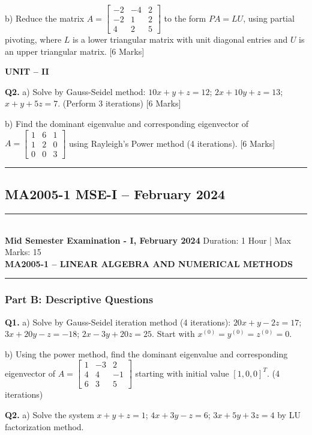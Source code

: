\documentclass[11pt,a4paper]{article}
\newcommand{\examheader}[4]{
\noindent\rule{\textwidth}{0.5pt}\\
\textbf{#1} \hfill Duration: #3 | Max Marks: #4\\
\textbf{#2}\\
\rule{\textwidth}{0.5pt}
\vspace{0.2cm}
}
\begin{document}
b) Reduce the matrix $A = \begin{bmatrix} -2 & -4 & 2 \\ -2 & 1 & 2 \\ 4 & 2 & 5 \end{bmatrix}$ to the form $PA = LU$, using partial pivoting, where $L$ is a lower triangular matrix with unit diagonal entries and $U$ is an upper triangular matrix. \hfill [6 Marks]

\textbf{UNIT -- II}

\textbf{Q2.} a) Solve by Gauss-Seidel method: $10x + y + z = 12$; $2x + 10y + z = 13$; $x + y + 5z = 7$. (Perform 3 iterations) \hfill [6 Marks]

b) Find the dominant eigenvalue and corresponding eigenvector of $A = \begin{bmatrix} 1 & 6 & 1 \\ 1 & 2 & 0 \\ 0 & 0 & 3 \end{bmatrix}$ using Rayleigh's Power method (4 iterations). \hfill [6 Marks]

\vspace{0.5cm}
\hrule
\vspace{0.5cm}

\subsection{MA2005-1 MSE-I -- February 2024}
\examheader{Mid Semester Examination - I, February 2024}{MA2005-1 -- LINEAR ALGEBRA AND NUMERICAL METHODS}{1 Hour}{15}

\subsubsection*{Part B: Descriptive Questions}

\textbf{Q1.} a) Solve by Gauss-Seidel iteration method (4 iterations): $20x + y - 2z = 17$; $3x + 20y - z = -18$; $2x - 3y + 20z = 25$. Start with $x^{(0)} = y^{(0)} = z^{(0)} = 0$.

b) Using the power method, find the dominant eigenvalue and corresponding eigenvector of $A = \begin{bmatrix} 1 & -3 & 2 \\ 4 & 4 & -1 \\ 6 & 3 & 5 \end{bmatrix}$ starting with initial value $[1, 0, 0]^T$. (4 iterations)

\textbf{Q2.} a) Solve the system $x + y + z = 1$; $4x + 3y - z = 6$; $3x + 5y + 3z = 4$ by LU factorization method.
\end{document}
